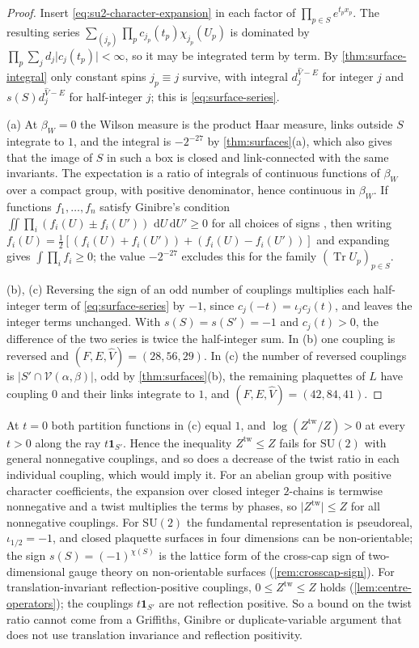 \documentclass[11pt,a4paper]{amsart}
\theoremstyle{definition}
\theoremstyle{remark}
\numberwithin{equation}{section}
\DeclareMathOperator{\Tr}{Tr}        %
\newcommand{\abs}[1]{\lvert #1\rvert}      %
\newcommand{\dd}{\,\mathrm{d}}             %
\newcommand{\SU}{\mathrm{SU}}              %
\newcommand{\betaW}{\beta_{W}}             %
\begin{document}
\begin{proof}
Insert \eqref{eq:su2-character-expansion} in each factor of $\prod_{p\in S}e^{t_px_p}$. The resulting series $\sum_{(j_p)}\prod_pc_{j_p}(t_p)\chi_{j_p}(U_p)$ is dominated by $\prod_p\sum_jd_j\abs{c_j(t_p)}<\infty$, so it may be integrated term by term. By \cref{thm:surface-integral} only constant spins $j_p\equiv j$ survive, with integral $d_j^{\hat V-E}$ for integer $j$ and $s(S)d_j^{\hat V-E}$ for half-integer $j$; this is \eqref{eq:surface-series}.

(a) At $\betaW=0$ the Wilson measure is the product Haar measure, links outside $S$ integrate to $1$, and the integral is $-2^{-27}$ by \cref{thm:surfaces}(a), which also gives that the image of $S$ in such a box is closed and link-connected with the same invariants. The expectation is a ratio of integrals of continuous functions of $\betaW$ over a compact group, with positive denominator, hence continuous in $\betaW$. If functions $f_1,\dots,f_n$ satisfy Ginibre's condition $\iint\prod_i(f_i(U)\pm f_i(U'))\,\dd U\dd U'\ge0$ for all choices of signs \cite{ginibre1970}, then writing $f_i(U)=\frac12[(f_i(U)+f_i(U'))+(f_i(U)-f_i(U'))]$ and expanding gives $\int\prod_if_i\ge0$; the value $-2^{-27}$ excludes this for the family $(\Tr U_p)_{p\in S}$.

(b), (c) Reversing the sign of an odd number of couplings multiplies each half-integer term of \eqref{eq:surface-series} by $-1$, since $c_j(-t)=\iota_jc_j(t)$, and leaves the integer terms unchanged. With $s(S)=s(S')=-1$ and $c_j(t)>0$, the difference of the two series is twice the half-integer sum. In (b) one coupling is reversed and $(F,E,\hat V)=(28,56,29)$. In (c) the number of reversed couplings is $\abs{S'\cap\mathcal V(\alpha,\beta)}$, odd by \cref{thm:surfaces}(b), the remaining plaquettes of $L$ have coupling $0$ and their links integrate to $1$, and $(F,E,\hat V)=(42,84,41)$.
\end{proof}

At $t=0$ both partition functions in (c) equal $1$, and $\log(Z^{\mathrm{tw}}/Z)>0$ at every $t>0$ along the ray $t\mathbf 1_{S'}$. Hence the inequality $Z^{\mathrm{tw}}\le Z$ fails for $\SU(2)$ with general nonnegative couplings, and so does a decrease of the twist ratio in each individual coupling, which would imply it. For an abelian group with positive character coefficients, the expansion over closed integer $2$-chains is termwise nonnegative and a twist multiplies the terms by phases, so $\abs{Z^{\mathrm{tw}}}\le Z$ for all nonnegative couplings. For $\SU(2)$ the fundamental representation is pseudoreal, $\iota_{1/2}=-1$, and closed plaquette surfaces in four dimensions can be non-orientable; the sign $s(S)=(-1)^{\chi(S)}$ is the lattice form of the cross-cap sign of two-dimensional gauge theory on non-orientable surfaces \cite{witten1991,drouffe1983} (\cref{rem:crosscap-sign}). For translation-invariant reflection-positive couplings, $0\le Z^{\mathrm{tw}}\le Z$ holds (\cref{lem:centre-operators}); the couplings $t\mathbf 1_{S'}$ are not reflection positive. So a bound on the twist ratio cannot come from a Griffiths, Ginibre or duplicate-variable argument that does not use translation invariance and reflection positivity.
\end{document}
